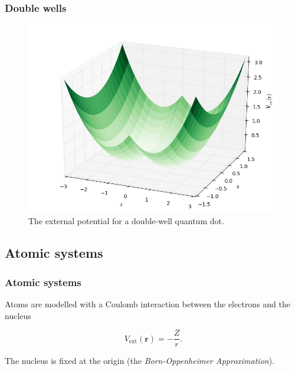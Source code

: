 \begin{frame}
\frametitle{Double wells}
 \begin{figure}
 \begin{center}
  \includegraphics[scale=0.4]{../graphics/Potentials/doubleWell.png}
  \caption{The external potential for a double-well quantum dot.}
  \label{fig:extPotDoubleWell}
 \end{center}
\end{figure}
\end{frame}

\subsection{Atomic systems}

\begin{frame}
 \frametitle{Atomic systems}
 
Atoms are modelled with a Coulomb interaction between the electrons and the nucleus 
 
 \begin{equation*}
 V_\mathrm{ext}(\mathbf{r}) = -\frac{Z}{r}. \label{eq:v0hydro}
\end{equation*}
\vspace{0.5cm}
 
The nucleus is fixed at the origin (the \textit{Born-Oppenheimer Approximation}).
 
\end{frame}

